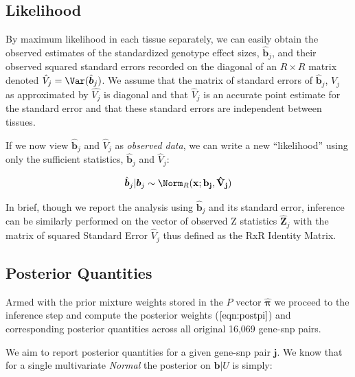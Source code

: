 \begin{enumerate}

\subsection{Likelihood}

By maximum likelihood in each tissue separately, we can easily obtain the observed estimates of the standardized genotype effect sizes, $\hat{\bm{b}}_{j}$, and their observed squared standard errors recorded on the diagonal of an $R \times R$ matrix denoted $\hat{V}_{j} = \Var(\hat{\bm{b}}_{j})$. 
We assume that the matrix of standard errors of $\hat{\bm{b}}_{j}$, $V_{j}$ as approximated by $\hat{V_{j}}$ is diagonal and  that $\hat{V}_{j}$ is an accurate point estimate for the standard error and that these standard errors are independent between tissues.

If we now view $\hat{\bm{b}}_{j}$ and $\hat{V}_{j}$ as \emph{observed data}, we can write a new ``likelihood'' using only the sufficient statistics,   $\hat{\bm{b}}_{j}$ and $\hat{V}_{j}$:

\begin{equation}
\hat{\bm{b}}_{j} | \bm{b}_{j} \sim \Norm_R(\bf{x}; \bm{b}_{j}, \hat{V}_{j})
    \label{eqn:new_lik}
\end{equation}

In brief, though we report the analysis using $\hat{\bm{b}}_{j}$ and its standard error, inference can be similarly performed on the vector of observed Z statistics $\hat{\bm{Z}}_{j}$ with the matrix of squared Standard Error $\hat{V}_{j}$ thus defined as the RxR Identity Matrix.

\subsection{Posterior Quantities}\label{sssec:posteriors}

Armed with the prior mixture weights stored in the $P$ vector $\hat{\bm{\pi}}$ we proceed to the inference step and compute the posterior weights ($\ref{eqn:postpi}$) and corresponding posterior quantities across all original 16,069 gene-snp pairs. %

We aim to report posterior quantities for a given gene-snp pair $\textbf{j}$. We know that for a single multivariate {\it Normal}  the posterior on  $\bm{b} | U$ is  simply: 


\end{enumerate}
